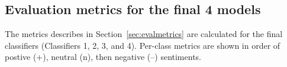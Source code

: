 \documentclass[11pt]{article}
\begin{document}
\subsection{Evaluation metrics for the final 4 models}\label{sec:4metrics}

The metrics describes in Section~\ref{sec:evalmetrics} are calculated for the final classifiers (Classifiers 1, 2, 3, and 4). 
Per-class metrics are shown in order of postive (+), neutral (n), then negative (--) sentiments.


\end{document}
